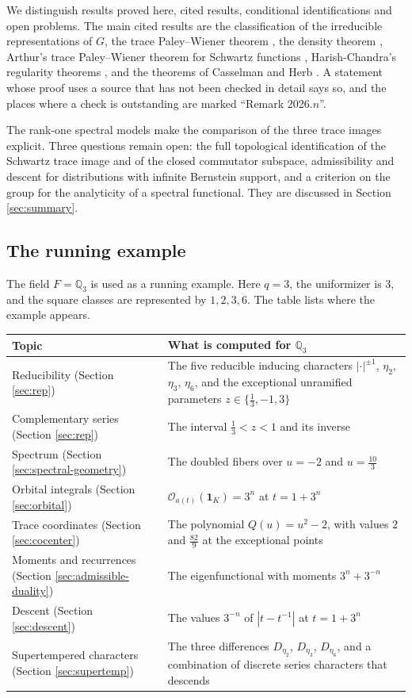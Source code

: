 \documentclass[12pt,letterpaper]{amsart}
\numberwithin{equation}{section}
\theoremstyle{definition}
\theoremstyle{remark}
\begin{document}
We distinguish results proved here, cited results, conditional identifications and open problems. The main cited results are the classification of the irreducible representations of $G$, the trace Paley--Wiener theorem \cite{BDK86}, the density theorem \cite{Ka86}, Arthur's trace Paley--Wiener theorem for Schwartz functions \cite{Ar94}, Harish-Chandra's regularity theorems \cite{HC99}, and the theorems of Casselman \cite{Ca77} and Herb \cite{He94}. A statement whose proof uses a source that has not been checked in detail says so, and the places where a check is outstanding are marked ``Remark 2026.$n$''.

The rank-one spectral models make the comparison of the three trace images explicit. Three questions remain open: the full topological identification of the Schwartz trace image and of the closed commutator subspace, admissibility and descent for distributions with infinite Bernstein support, and a criterion on the group for the analyticity of a spectral functional. They are discussed in Section \ref{sec:summary}.

\subsection{The running example}\label{sec:running}
The field $F=\mathbb Q_3$ is used as a running example. Here $q=3$, the uniformizer is $3$, and the square classes are represented by $1,2,3,6$. The table lists where the example appears.
\begin{center}\small
\begin{tabularx}{\linewidth}{@{}p{.37\linewidth}X@{}}\toprule
Topic & What is computed for $\mathbb Q_3$\\\midrule
Reducibility (Section \ref{sec:rep}) & The five reducible inducing characters $|\cdot|^{\pm1}$, $\eta_2$, $\eta_3$, $\eta_6$, and the exceptional unramified parameters $z\in\{\tfrac13,-1,3\}$\\
Complementary series (Section \ref{sec:rep}) & The interval $\tfrac13<z<1$ and its inverse\\
Spectrum (Section \ref{sec:spectral-geometry}) & The doubled fibers over $u=-2$ and $u=\tfrac{10}3$\\
Orbital integrals (Section \ref{sec:orbital}) & $\mathcal O_{a(t)}(\mathbf 1_K)=3^n$ at $t=1+3^n$\\
Trace coordinates (Section \ref{sec:cocenter}) & The polynomial $Q(u)=u^2-2$, with values $2$ and $\tfrac{82}9$ at the exceptional points\\
Moments and recurrences (Section \ref{sec:admissible-duality}) & The eigenfunctional with moments $3^n+3^{-n}$\\
Descent (Section \ref{sec:descent}) & The values $3^{-n}$ of $|t-t^{-1}|$ at $t=1+3^n$\\
Supertempered characters (Section \ref{sec:supertemp}) & The three differences $D_{\eta_2}$, $D_{\eta_3}$, $D_{\eta_6}$, and a combination of discrete series characters that descends\\\bottomrule
\end{tabularx}
\end{center}
\end{document}
